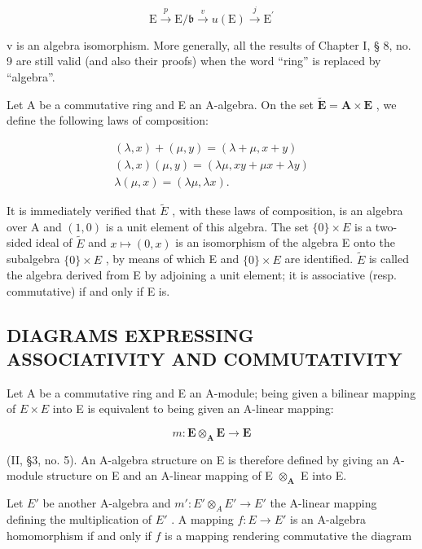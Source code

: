 \[
\mathrm{E} \xrightarrow {p} \mathrm{E} / \mathfrak {b} \xrightarrow {v} u (\mathrm{E}) \xrightarrow {j} \mathrm{E} ^ {\prime}
\]

v is an algebra isomorphism. More generally, all the results of Chapter I, § 8, no. 9 are still valid (and also their proofs) when the word ``ring'' is replaced by ``algebra''.

Let A be a commutative ring and E an A-algebra. On the set \(\tilde{\mathbf{E}} = \mathbf{A} \times \mathbf{E}\) , we define the following laws of composition:

\[
\begin{array}{r} (\lambda , x) + (\mu , y) = (\lambda + \mu , x + y) \\ (\lambda , x) (\mu , y) = (\lambda \mu , x y + \mu x + \lambda y) \\ \lambda (\mu , x) = (\lambda \mu , \lambda x). \end{array}
\]

It is immediately verified that \(\tilde{E}\) , with these laws of composition, is an algebra over A and \((1,0)\) is a unit element of this algebra. The set \(\{0\}\times E\) is a two-sided ideal of \(\tilde{E}\) and \(x\mapsto(0,x)\) is an isomorphism of the algebra E onto the subalgebra \(\{0\}\times E\) , by means of which E and \(\{0\}\times E\) are identified. \(\tilde{E}\) is called the algebra derived from E by adjoining a unit element; it is associative (resp. commutative) if and only if E is.

\subsection{DIAGRAMS EXPRESSING ASSOCIATIVITY AND COMMUTATIVITY}

Let A be a commutative ring and E an A-module; being given a bilinear mapping of \(E \times E\) into E is equivalent to being given an A-linear mapping:

\[
m: \mathbf {E} \otimes_ {\mathbf {A}} \mathbf {E} \rightarrow \mathbf {E}
\]

(II, §3, no. 5). An A-algebra structure on E is therefore defined by giving an A-module structure on E and an A-linear mapping of E \(\otimes_{\mathbf{A}}\) E into E.

Let \(E'\) be another A-algebra and \(m': E' \otimes_{A} E' \to E'\) the A-linear mapping defining the multiplication of \(E'\) . A mapping \(f: E \to E'\) is an A-algebra homomorphism if and only if \(f\) is a mapping rendering commutative the diagram


